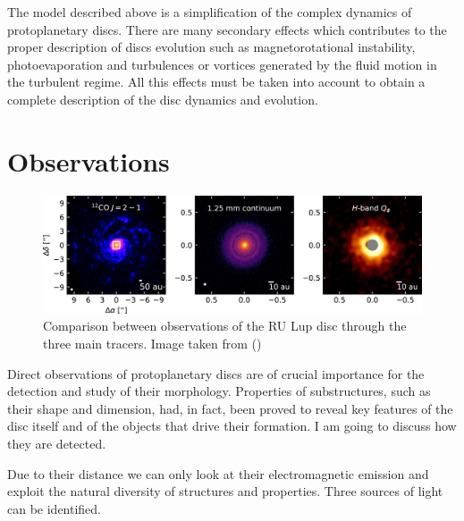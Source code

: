 \documentclass[a4paper,10pt]{report}
\begin{document}
The model described above is a simplification of the complex dynamics of protoplanetary discs. 
There are many secondary effects
which contributes to the proper description of discs evolution such as magnetorotational instability, photoevaporation and 
turbulences or vortices generated by the fluid motion in the turbulent regime. All 
this effects must be taken into account to obtain a complete description of the disc dynamics and evolution.

\section{Observations}

\begin{figure}
    \begin{center}
        \includegraphics[width=\textwidth]{images/2.2.tracers.comparison/apjaba1e1f9_hr.jpg}
    \end{center}
    \caption{Comparison between observations of the RU Lup disc through the three main tracers.
    Image taken from ()}
\end{figure}


Direct observations of protoplanetary discs are of crucial importance for the detection and study of their morphology.
Properties of substructures, such as their shape and dimension, had, in fact, 
been proved to reveal key features of the disc itself and
of the objects that drive their formation. I am going to discuss how they are detected.

Due to their distance we can only look at their electromagnetic emission
and exploit the natural diversity of structures and properties. 
Three sources of light can be identified.
\end{document}
